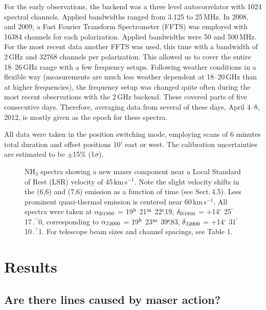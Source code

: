 \documentclass[oldversion]{aa}
\def\ffas {\hbox{$\,.\!\!^{\prime\prime}$}}
\def\ffs {\hbox{$\,.\!\!\!^{\rm s}$}}
\def\ffas {\hbox{$\,.\!\!^{\prime\prime}$}}
\begin{document}
For the early observations, the backend was a three level autocorrelator 
with 1024 spectral channels. Applied bandwidths ranged from 3.125 to 
25\,MHz. In 2008, and 2009, a Fast Fourier Transform Spectrometer (FFTS) was 
employed with 16384 channels for each polarization. Applied bandwidths 
were 50 and 500\,MHz. For the most recent data another FFTS was used, 
this time with a bandwidth of 2\,GHz and 32768 channels per polarization. 
This allowed us to cover the entire 18--26\,GHz range with a few 
frequency setups. Following weather conditions in a flexible way
(measurements are much less weather dependent at 18--20\,GHz 
than at higher frequencies), the frequency setup was changed quite often 
during the most recent observations with the 2\,GHz backend. These
covered parts of five consecutive days. Therefore, averaging data 
from several of these days, April 4--8, 2012, is mostly given as 
the epoch for these spectra. 

All data were taken in the position switching mode, employing scans 
of 6 minutes total duration and offset positions 10$'$ east or west. 
The calibration uncertainties are estimated to be $\pm$15\% (1$\sigma$). 



\begin{figure}[t]
\vspace{0.0cm}
\centering
{}
\vspace{-1.0cm}
\caption{NH$_3$ spectra showing a new maser component near a Local Standard of 
Rest (LSR) velocity of 45\,km\,s$^{-1}$. Note the slight velocity shifts in the 
(6,6) and (7,6) emission as a function of time (see Sect.\,4.5). Less prominent 
quasi-thermal emission is centered near 60\,km\,s$^{-1}$. All spectra were taken 
at $\alpha_{\rm B1950}$ = 19$^{\rm h}$ 21$^{\rm m}$ 22\ffs19, $\delta_{\rm B1950}$ 
= +14$^{\circ}$ 25$^{\prime}$ 17\ffas0, corresponding to $\alpha_{\rm J2000}$ = 
19$^{\rm h}$ 23$^{\rm m}$ 39\ffs83, $\delta_{\rm J2000}$ = +14$^{\circ}$ 31$^{\prime}$ 
10\ffas1. For telescope beam sizes and channel spacings, see Table 1.
\label{fig1}}
\end{figure}


\section{Results}

\subsection{Are there lines caused by maser action?}
\end{document}

